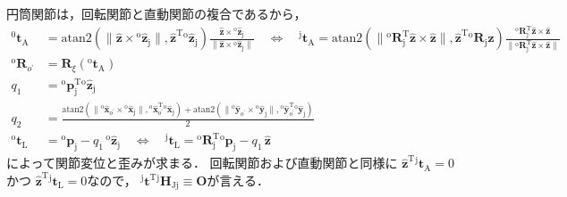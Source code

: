 ﻿\documentclass[a4paper]{jsarticle}
\begin{document}
円筒関節は，回転関節と直動関節の複合であるから，
\begin{align*}
{}^{0}\bm{t}_{\mathrm{A}}
&=\mathrm{atan2}(\|\hat{\bm{z}}\times{}^{\mathrm{o}}\hat{\bm{z}}_{\mathrm{j}}\|,\hat{\bm{z}}^{\mathrm{T}}{}^{\mathrm{o}}\hat{\bm{z}}_{\mathrm{j}})
\frac{\hat{\bm{z}}\times{}^{\mathrm{o}}\hat{\bm{z}}_{\mathrm{j}}}{\|\hat{\bm{z}}\times{}^{\mathrm{o}}\hat{\bm{z}}_{\mathrm{j}}\|}
\quad\Leftrightarrow\quad
{}^{\mathrm{j}}\bm{t}_{\mathrm{A}}
=\mathrm{atan2}(\|{}^{\mathrm{o}}\bm{R}_{\mathrm{j}}^{\mathrm{T}}\hat{\bm{z}}\times\hat{\bm{z}}\|,\hat{\bm{z}}^{\mathrm{T}}{}^{\mathrm{o}}\bm{R}_{\mathrm{j}}\hat{\bm{z}})
\frac{{}^{\mathrm{o}}\bm{R}_{\mathrm{j}}^{\mathrm{T}}\hat{\bm{z}}\times\hat{\bm{z}}}
     {\|{}^{\mathrm{o}}\bm{R}_{\mathrm{j}}^{\mathrm{T}}\hat{\bm{z}}\times\hat{\bm{z}}\|}
\\
{}^{\mathrm{o}}\bm{R}_{o^{\prime}}&=\bm{R}_{\xi}({}^{\mathrm{o}}\bm{t}_{\mathrm{A}})
\\
q_{1}&={}^{\mathrm{o}}\bm{p}_{\mathrm{j}}^{\mathrm{T}}{}^{\mathrm{o}}\hat{\bm{z}}_{\mathrm{j}}
\\
q_{2}&=\frac{
 \mathrm{atan2}(\|{}^{\mathrm{o}}\hat{\bm{x}}_{o^{\prime}}\times{}^{\mathrm{o}}\hat{\bm{x}}_{\mathrm{j}}\|,
        {}^{\mathrm{o}}\hat{\bm{x}}_{o^{\prime}}^{\mathrm{T}}{}^{\mathrm{o}}\hat{\bm{x}}_{\mathrm{j}})
+\mathrm{atan2}(\|{}^{\mathrm{o}}\hat{\bm{y}}_{o^{\prime}}\times{}^{\mathrm{o}}\hat{\bm{y}}_{\mathrm{j}}\|,
        {}^{\mathrm{o}}\hat{\bm{y}}_{o^{\prime}}^{\mathrm{T}}{}^{\mathrm{o}}\hat{\bm{y}}_{\mathrm{j}})
 }{2}
\\
{}^{\mathrm{o}}\bm{t}_{\mathrm{L}}&={}^{\mathrm{o}}\bm{p}_{\mathrm{j}}-q_{1}\,{}^{\mathrm{o}}\hat{\bm{z}}_{\mathrm{j}}
\quad\Leftrightarrow\quad
{}^{\mathrm{j}}\bm{t}_{\mathrm{L}}={}^{\mathrm{o}}\bm{R}_{\mathrm{j}}^{\mathrm{T}}{}^{\mathrm{o}}\bm{p}_{\mathrm{j}}-q_{1}\,\hat{\bm{z}}
\end{align*}
によって関節変位と歪みが求まる．
回転関節および直動関節と同様に
$\hat{\bm{z}}^{\mathrm{T}}{}^{\mathrm{j}}\bm{t}_{\mathrm{A}}=0$かつ
$\hat{\bm{z}}^{\mathrm{T}}{}^{\mathrm{j}}\bm{t}_{\mathrm{L}}=0$なので，
${}^{\mathrm{j}}\bm{t}^{\mathrm{T}}{}^{\mathrm{j}}\bm{H}_{\mathrm{Jj}}\equiv\bm{O}$が言える．



\vspace{\baselineskip}

\end{document}
